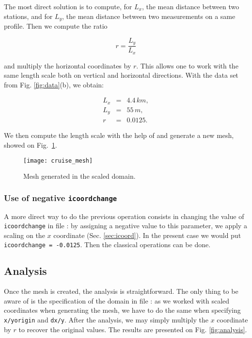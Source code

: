 The most direct solution is to compute, for $L_{x}$, the mean distance between two stations, and for $L_{y}$, the mean distance between two measurements on a same profile. Then we compute the ratio

\[r = \frac{L_y}{L_x}\]

and multiply the horizontal coordinates by $r$. This allows one to work with the same length scale both on vertical and horizontal directions. With the  data set from Fig. \ref{fig:data}(b), we obtain:

\begin{eqnarray*}
L_{x} &=& 4.4\,km,\\
L_{y} &=& 55\,m,\\
	r   &=& 0.0125.
\end{eqnarray*}

We then compute the length scale with the help of  and generate a new mesh, showed on Fig.~\ref{fig:mesh}. 

\begin{figure}[H]
\centering
\texttt{[image: cruise\_mesh]}
\caption{Mesh generated in the scaled domain.\label{fig:mesh}}
\end{figure}

\subsubsection{Use of negative \texttt{icoordchange}}

A more direct way to do the previous operation consists in changing the value of \texttt{icoord\-change} in file : by assigning a negative value to this parameter, we apply a scaling on the $x$ coordinate (Sec. \ref{sec:icoord}). In the present case we would put\, \texttt{icoordchange = -0.0125}. Then the classical \diva operations can be done.



\subsection{Analysis}

Once the mesh is created, the analysis is straightforward. The only thing to be aware of is the specification of the domain in file : as we worked with scaled coordinates when generating the mesh, we have to do the same when specifying \texttt{x/yorigin} and \texttt{dx/y}. After the analysis, we may simply multiply the $x$ coordinate by $r$ to recover the original values. The results are presented on Fig. \ref{fig:analysis}.  

